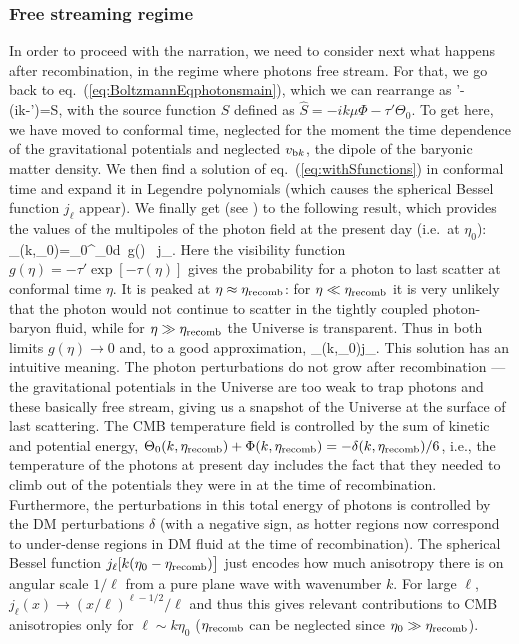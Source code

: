 \subsubsection*{Free streaming regime}
In order to proceed with the narration, we need  to consider next what happens after recombination, in the regime where photons free stream. 
For that, we go back to eq.~(\ref{eq:BoltzmannEqphotonsmain}), which we can rearrange as 
\beq
\label{eq:withSfunctions}
\Theta'-(ik\mu-\tau')\Theta=\hat S,
\eeq
with the source function $\hat S$ defined as $\hat S=-i k\mu\Phi-\tau'\Theta_0$. To get here, we have moved to conformal time, neglected for the moment the time dependence of the gravitational potentials and neglected $v_{{\rm b}k}$, the dipole of the baryonic matter density. 
We then find a solution of eq.~(\ref{eq:withSfunctions}) in conformal time and expand it in Legendre polynomials (which causes the spherical Bessel function $j_\ell$ appear).
We finally get (see \cite{cosmobooks}) to the following result, which provides the values of the multipoles of the photon field at the present day (i.e.~at $\eta_0$): 
\beq
\Theta_\ell(k,\eta_0)=\int_0^{\eta_0}d\eta \ g(\eta)  \ j_.
\eeq
Here the visibility function $g(\eta)=-\tau' \exp[-\tau(\eta)]$ gives the probability for a photon to last scatter at conformal time $\eta$. 
It is peaked at $\eta\approx \eta_{\rm recomb}$: for $\eta\ll \eta_{\rm recomb}$ it is very unlikely that the photon would not continue to scatter in the tightly coupled photon-baryon fluid, while for $\eta\gg \eta_{\rm recomb}$ the Universe is transparent.
Thus in both limits $g(\eta)\to 0$ and, to a good approximation,
\beq
\label{eq:Theta:l}
\Theta_\ell(k,\eta_0)\approx{}j_.
\eeq
This solution has an intuitive meaning. 
The photon perturbations do not grow after recombination --- the gravitational potentials in the Universe are too weak to trap photons and these basically free stream, giving us a snapshot of the Universe at the surface of last scattering. The CMB temperature field is controlled by the sum of kinetic and potential energy, $\Theta_0(k,\eta_{\rm recomb})+\Phi(k,\eta_{\rm recomb})=-\delta(k,\eta_{\rm recomb})/6$, i.e., the temperature of the photons at present day includes the fact that they needed to climb out of the potentials they were in at the time of recombination. Furthermore, the perturbations in this total energy of photons is controlled by the DM perturbations $\delta$ (with a negative sign, as hotter regions now correspond to under-dense regions in DM fluid at the time of recombination). 
The spherical Bessel function $j_\ell[k(\eta_0-\eta_{\rm recomb})\big]$ just encodes how much anisotropy there is on angular scale $1/\ell$ from a pure plane wave with wavenumber $k$. For large $\ell$, $j_\ell(x)\to (x/\ell)^{\ell-1/2}/{\ell} $ 
and thus this gives relevant contributions to CMB anisotropies only for $\ell\sim k\eta_0$ ($\eta_{\rm recomb}$ can be neglected since $\eta_0\gg \eta_{\rm recomb}$).

